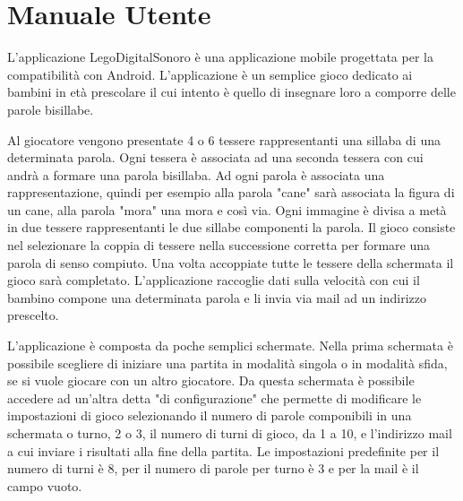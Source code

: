 \renewcommand*{\mypath}{legodigitalsonoro1}%
\graphicspath{{\mypath/images/}}


\localtableofcontents
\newpage

\newcommand{\includefigure}[2]{
\begin{figure}[h!]
\centering{
\texttt{[image: \#1.png]}}
\caption{#2}
\label{fig:#1}
\end{figure}
}

\section{Manuale Utente}

L'applicazione LegoDigitalSonoro è una applicazione mobile progettata per la compatibilità con Android. L'applicazione è un semplice gioco dedicato ai bambini in età prescolare il cui intento è quello di insegnare loro a comporre delle parole bisillabe.

Al giocatore vengono presentate 4 o 6 tessere rappresentanti una sillaba di una determinata parola. Ogni tessera è associata ad una seconda tessera con cui andrà a formare una parola bisillaba. Ad ogni parola è associata una rappresentazione, quindi per esempio alla parola "cane" sarà associata la figura di un cane, alla parola "mora" una mora e così via. Ogni immagine è divisa a metà in due tessere rappresentanti le due sillabe componenti la parola. Il gioco consiste nel selezionare la coppia di tessere nella successione corretta per formare una parola di senso compiuto. Una volta accoppiate tutte le tessere della schermata il gioco sarà completato. L'applicazione raccoglie dati sulla velocità con cui il bambino compone una determinata parola e li invia via mail ad un indirizzo prescelto.

L'applicazione è composta da poche semplici schermate. Nella prima schermata è possibile scegliere di iniziare una partita in modalità singola o in modalità sfida, se si vuole giocare con un altro giocatore. Da questa schermata è possibile accedere ad un'altra detta "di configurazione" che permette di modificare le impostazioni di gioco selezionando il numero di parole componibili in una schermata o turno, 2 o 3, il numero di turni di gioco, da 1 a 10, e l'indirizzo mail a cui inviare i risultati alla fine della partita. Le impostazioni predefinite per il numero di turni è 8, per il numero di parole per turno è 3 e per la mail è il campo vuoto.

